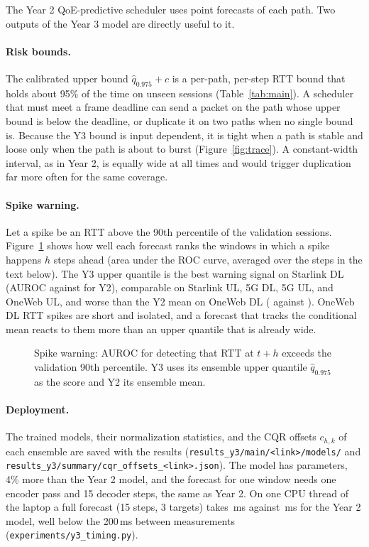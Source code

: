 The Year 2 QoE-predictive scheduler uses point forecasts of each path. Two outputs of the Year 3 model are directly useful to it.

\paragraph{Risk bounds.} The calibrated upper bound $\hat{q}_{0.975}+c$ is a per-path, per-step RTT bound that holds about 95\% of the time on unseen sessions (Table~\ref{tab:main}). A scheduler that must meet a frame deadline can send a packet on the path whose upper bound is below the deadline, or duplicate it on two paths when no single bound is. Because the Y3 bound is input dependent, it is tight when a path is stable and loose only when the path is about to burst (Figure~\ref{fig:trace}). A constant-width interval, as in Year 2, is equally wide at all times and would trigger duplication far more often for the same coverage.

\paragraph{Spike warning.} Let a spike be an RTT above the 90th percentile of the validation sessions. Figure~\ref{fig:spike} shows how well each forecast ranks the windows in which a spike happens $h$ steps ahead (area under the ROC curve, averaged over the steps in the text below). The Y3 upper quantile is the best warning signal on Starlink DL (AUROC \AUCYthreeSLDL{} against \AUCYtwoSLDL{} for Y2), comparable on Starlink UL, 5G DL, 5G UL, and OneWeb UL, and worse than the Y2 mean on OneWeb DL (\AUCYthreeOWDL{} against \AUCYtwoOWDL). OneWeb DL RTT spikes are short and isolated, and a forecast that tracks the conditional mean reacts to them more than an upper quantile that is already wide.

\begin{figure}[t]
  \centering
  \resizebox{\linewidth}{!}{}
  \caption{Spike warning: AUROC for detecting that RTT at $t+h$ exceeds the validation 90th percentile. Y3 uses its ensemble upper quantile $\hat{q}_{0.975}$ as the score and Y2 its ensemble mean.}
  \label{fig:spike}
\end{figure}

\paragraph{Deployment.} The trained models, their normalization statistics, and the CQR offsets $c_{h,k}$ of each ensemble are saved with the results (\texttt{results\_\allowbreak{}y3/\allowbreak{}main/\allowbreak{}<link>/\allowbreak{}models/\allowbreak{}} and \texttt{results\_\allowbreak{}y3/\allowbreak{}summary/\allowbreak{}cqr\_\allowbreak{}offsets\_\allowbreak{}<link>.json}). The model has \ParamsDist{} parameters, 4\% more than the Year 2 model, and the forecast for one window needs one encoder pass and 15 decoder steps, the same as Year 2. On one CPU thread of the laptop a full forecast (15 steps, 3 targets) takes \TimeDSCPU\,ms against \TimeSSCPU\,ms for the Year 2 model, well below the 200\,ms between measurements (\texttt{experiments/\allowbreak{}y3\_\allowbreak{}timing.py}).

